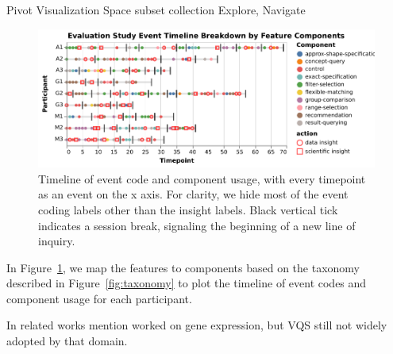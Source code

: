 Pivot Visualization Space
subset collection Explore, Navigate
\begin{figure}[h!]
  \includegraphics[width=\linewidth]{figures/evalstudytimeline.pdf}
  \caption{Timeline of event code and component usage, with every timepoint as an event on the x axis. For clarity, we hide most of the event coding labels other than the insight labels. Black vertical tick indicates a session break, signaling the beginning of a new line of inquiry.}\label{fig:evalstudytimeline}
\end{figure}
In Figure~\ref{fig:evalstudytimeline}, we map the features to components based on the taxonomy described in Figure~\ref{fig:taxonomy} to plot the timeline of event codes and component usage for each participant.

In related works mention \cite{Hochheiser2004} worked on gene expression, but VQS still not widely adopted by that domain.
